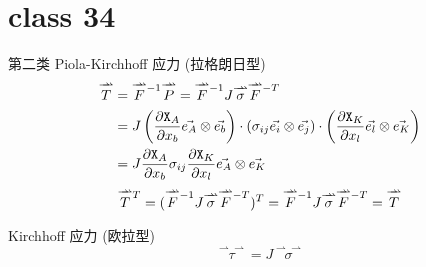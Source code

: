 \documentclass[12pt, a4paper, oneside, UTF8]{ctexbook}  %
\newcommand{\pa}{\partial}
\newcommand{\vvec}{\overset{\rightharpoonup\!\!\!\! \rightharpoonup}}
\newcommand{\X}{\mathtt{X}}
\newcommand{\lmT}{\raisebox{-0.85ex}{$\scriptstyle -T$}} %
\newcommand{\lmone}{\raisebox{-0.85ex}{$\scriptstyle -1$}} %
\newcommand{\lsup}[1]{\raisebox{-0.85ex}{$\scriptstyle #1$}}
\begin{document}
\section{class 34}
\begin{defn}
	第二类 Piola-Kirchhoff 应力 (拉格朗日型)
	\begin{align*}
		\vvec{T}&=\vvec{F}^{\lmone}\vvec{P}=\vvec{F}^{\lmone} J\vvec{\sigma}\vvec{F}^{\lmT}\\
		&=J\left(\frac{\pa \X_A}{\pa x_b}\vec{e_A}\otimes\vec{e_b}\right)\cdot\left(\sigma_{ij}\vec{e_i}\otimes\vec{e_j}\right)\cdot
		\left(\frac{\pa \X_K}{\pa x_l}\vec{e_l}\otimes\vec{e_K}\right)\\
		&=J\frac{\pa \X_A}{\pa x_b}\sigma_{ij}\frac{\pa \X_K}{\pa x_l}\vec{e_A}\otimes\vec{e_K}
	\end{align*}
	\[\vvec{T}^{\lsup{T}}=(\vvec{F}^{\lmone} J\vvec{\sigma}\vvec{F}^{\lmT})^T
	=\vvec{F}^{\lmone} J\vvec{\sigma}\vvec{F}^{\lmT}=\vvec{T}\]
\end{defn}
\begin{defn}
	Kirchhoff 应力 (欧拉型)
	\[\vvec{\tau}=J\vvec{\sigma}\]
\end{defn}
\end{document}

